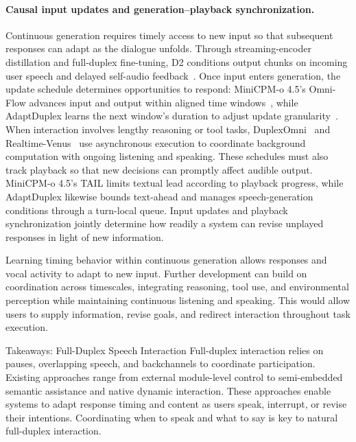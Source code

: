 \paragraph{Causal input updates and generation--playback synchronization.}
Continuous generation requires timely access to new input so that subsequent responses can adapt as the dialogue unfolds. Through streaming-encoder distillation and full-duplex fine-tuning, D2 conditions output chunks on incoming user speech and delayed self-audio feedback~\citep{arXiv:2610.17124}. Once input enters generation, the update schedule determines opportunities to respond: MiniCPM-o 4.5's Omni-Flow advances input and output within aligned time windows~\citep{DBLP:journals/corr/abs-2604-27393}, while AdaptDuplex learns the next window's duration to adjust update granularity~\citep{DBLP:journals/corr/abs-2609-29217}. When interaction involves lengthy reasoning or tool tasks, DuplexOmni~\citep{DBLP:journals/corr/abs-2606-09186} and Realtime-Venus~\citep{DBLP:journals/corr/abs-2609-13814} use asynchronous execution to coordinate background computation with ongoing listening and speaking. These schedules must also track playback so that new decisions can promptly affect audible output. MiniCPM-o 4.5's TAIL limits textual lead according to playback progress, while AdaptDuplex likewise bounds text-ahead and manages speech-generation conditions through a turn-local queue. Input updates and playback synchronization jointly determine how readily a system can revise unplayed responses in light of new information.

Learning timing behavior within continuous generation allows responses and vocal activity to adapt to new input. Further development can build on coordination across timescales, integrating reasoning, tool use, and environmental perception while maintaining continuous listening and speaking. This would allow users to supply information, revise goals, and redirect interaction throughout task execution.

\begin{TakeawayBox}{Takeaways: Full-Duplex Speech Interaction}
Full-duplex interaction relies on pauses, overlapping speech, and backchannels
to coordinate participation. Existing approaches range from external
module-level control to semi-embedded semantic assistance and native dynamic
interaction. These approaches enable systems to adapt response timing and
content as users speak, interrupt, or revise their intentions. Coordinating
when to speak and what to say is key to natural full-duplex interaction.
\end{TakeawayBox}


